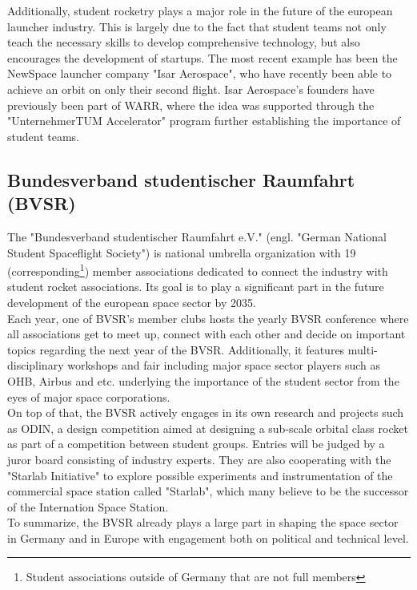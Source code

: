 \documentclass[fontsize=11pt,%
twoside,%
BCOR          = 8mm, %
DIV           = 11,  %
titlepage     = off,%
index=totoc,%
xcolor        = pdftex,%
dvipsnames,%
bibliography  = totoc,%
bibliography = numbered, %
listof        = notnumbered]{scrreprt}
\begin{document}
Additionally, student rocketry plays a major role in the future of the european launcher industry. This is largely due to the fact that student teams not only teach the necessary skills to develop comprehensive technology, but also encourages the development of startups. The most recent example has been the NewSpace launcher company "Isar Aerospace", who have recently been able to achieve an orbit on only their second flight. Isar Aerospace's founders have previously been part of WARR, where the idea was supported through the "UnternehmerTUM Accelerator" program\cite{IsarAerospace} further establishing the importance of student teams.

\subsection{Bundesverband studentischer Raumfahrt (BVSR)}
The "Bundesverband studentischer Raumfahrt e.V." (engl. "German National Student Spaceflight Society") is national umbrella organization with 19 (corresponding\footnote{Student associations outside of Germany that are not full members}) member associations dedicated to connect the industry with student rocket associations. Its goal is to play a significant part in the future development of the european space sector by 2035\cite{BVSR}.\\
Each year, one of BVSR's member clubs hosts the yearly BVSR conference where all associations get to meet up, connect with each other and decide on important topics regarding the next year of the BVSR. Additionally, it features multi-disciplinary workshops and fair including major space sector players such as OHB, Airbus and etc. underlying the importance of the student sector from the eyes of major space corporations.\\
On top of that, the BVSR actively engages in its own research and projects such as ODIN, a design competition aimed at designing a sub-scale orbital class rocket as part of a competition between student groups\cite{BVSR}. Entries will be judged by a juror board consisting of industry experts. They are also cooperating with the "Starlab Initiative" to explore possible experiments and instrumentation of the commercial space station called "Starlab"\cite{BVSR}, which many believe to be the successor of the Internation Space Station.\\
To summarize, the BVSR already plays a large part in shaping the space sector in Germany and in Europe with engagement both on political and technical level.
\end{document}
